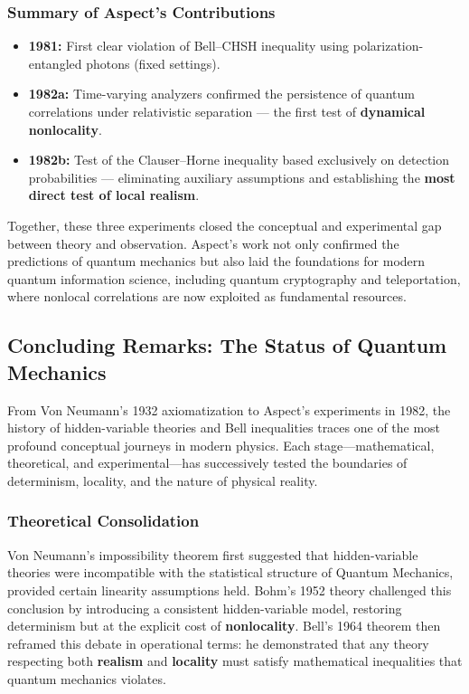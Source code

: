\subsubsection{Summary of Aspect’s Contributions}

\begin{itemize}
    \item \textbf{1981:} First clear violation of Bell–CHSH inequality using polarization-entangled photons (fixed settings).  
    \item \textbf{1982a:} Time-varying analyzers confirmed the persistence of quantum correlations under relativistic separation — the first test of \textbf{dynamical nonlocality}.  
    \item \textbf{1982b:} Test of the Clauser–Horne inequality based exclusively on detection probabilities — eliminating auxiliary assumptions and establishing the \textbf{most direct test of local realism}.
\end{itemize}

Together, these three experiments closed the conceptual and experimental gap between theory and observation.  
Aspect’s work not only confirmed the predictions of quantum mechanics but also laid the foundations for modern quantum information science, including quantum cryptography and teleportation, where nonlocal correlations are now exploited as fundamental resources.

\subsection{Concluding Remarks: The Status of Quantum Mechanics}

From Von Neumann’s 1932 axiomatization to Aspect’s experiments in 1982, the history of hidden-variable theories and Bell inequalities traces one of the most profound conceptual journeys in modern physics.  
Each stage—mathematical, theoretical, and experimental—has successively tested the boundaries of determinism, locality, and the nature of physical reality.

\subsubsection{Theoretical Consolidation}

Von Neumann’s impossibility theorem first suggested that hidden-variable theories were incompatible with the statistical structure of Quantum Mechanics, provided certain linearity assumptions held.  
Bohm’s 1952 theory challenged this conclusion by introducing a consistent hidden-variable model, restoring determinism but at the explicit cost of \textbf{nonlocality}.  
Bell’s 1964 theorem then reframed this debate in operational terms: he demonstrated that any theory respecting both \textbf{realism} and \textbf{locality} must satisfy mathematical inequalities that quantum mechanics violates.

